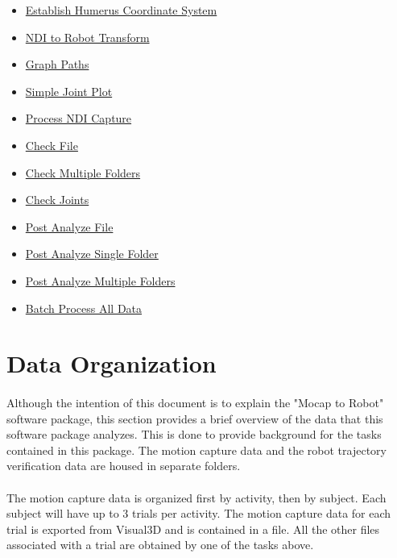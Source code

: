 \documentclass[letterpaper]{article}
\begin{document}
\begin{itemize}
		\begin{itemize}
			\item \hyperref[establishHumerusCS]{Establish Humerus Coordinate System}
			\item \hyperref[ndiToRobotTransform]{NDI to Robot Transform}
			\item \hyperref[GraphPaths]{Graph Paths}
			\item \hyperref[SimpleJointPlot]{Simple Joint Plot}
			\item \hyperref[processNdiCapture]{Process NDI Capture}
			\item \hyperref[checkFile]{Check File}
			\item \hyperref[checkMultipleFolders]{Check Multiple Folders}
			\item \hyperref[checkJoints]{Check Joints}
			\item \hyperref[postAnalysisFile]{Post Analyze File}
			\item \hyperref[postAnalysisSingleFolder]{Post Analyze Single Folder}
			\item \hyperref[postAnalysisMultipleFolders]{Post Analyze Multiple Folders}
			\item \hyperref[batchProcessAllData]{Batch Process All Data}
		\end{itemize}
\end{itemize}

\section{Data Organization} \label{sec:dataOrg}
\paragraph{}
Although the intention of this document is to explain the "Mocap to Robot" software package, this section provides a brief overview of the data that this software package analyzes. This is done to provide background for the tasks contained in this package. The motion capture data and the robot trajectory verification data are housed in separate folders.
\paragraph{}
The motion capture data is organized first by activity, then by subject. Each subject will have up to 3 trials per activity. The motion capture data for each trial is exported from Visual3D and is contained in a  file. All the other files associated with a trial are obtained by one of the tasks above.
\end{document}
